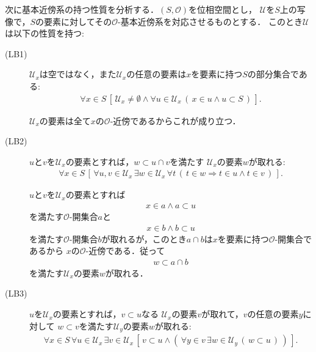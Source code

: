 	次に基本近傍系の持つ性質を分析する．$(S,\mathscr{O})$を位相空間とし，
	$\mathcal{U}$を$S$上の写像で，$S$の要素に対してその$\mathscr{O}$-基本近傍系を対応させるものとする．
	このとき$\mathcal{U}$は以下の性質を持つ:
	\begin{description}
		\item[(LB1)] $\mathcal{U}_{x}$は空ではなく，また$\mathcal{U}_{x}$の任意の要素は$x$を要素に持つ$S$の部分集合である:
			\begin{align}
				\forall x \in S\, \left[\, \mathcal{U}_{x} \neq \emptyset 
				\wedge \forall u \in \mathcal{U}_{x}\, (\, x \in u \wedge u \subset S\, )\, \right].
			\end{align}
			
			\begin{sketch}
				$\mathscr{U}_{x}$の要素は全て$x$の$\mathscr{O}$-近傍であるからこれが成り立つ．
				\QED
			\end{sketch}
			
		\item[(LB2)] $u$と$v$を$\mathcal{U}_{x}$の要素とすれば，$w \subset u \cap v$を満たす
			$\mathcal{U}_{x}$の要素$w$が取れる:
			\begin{align}
				\forall x \in S\, 
				\left[\, \forall u,v \in \mathcal{U}_{x}\, \exists w \in \mathcal{U}_{x}\,
				\forall t\, \left(\, t \in w \Longrightarrow t \in u \wedge t \in v\, \right)\, \right].
			\end{align}
			
			\begin{sketch}
				$u$と$v$を$\mathcal{U}_{x}$の要素とすれば
				\begin{align}
					x \in a \wedge a \subset u
				\end{align}
				を満たす$\mathscr{O}$-開集合$a$と
				\begin{align}
					x \in b \wedge b \subset u
				\end{align}
				を満たす$\mathscr{O}$-開集合$b$が取れるが，このとき$a \cap b$は$x$を要素に持つ$\mathscr{O}$-開集合であるから
				$x$の$\mathscr{O}$-近傍である．従って
				\begin{align}
					w \subset a \cap b
				\end{align}
				を満たす$\mathcal{U}_{x}$の要素$w$が取れる．
				\QED
			\end{sketch}
			
		\item[(LB3)] $u$を$\mathcal{U}_{x}$の要素とすれば，$v \subset u$なる
			$\mathcal{U}_{x}$の要素$v$が取れて，$v$の任意の要素$y$に対して
			$w \subset v$を満たす$\mathcal{U}_{y}$の要素$w$が取れる:
			\begin{align}
				\forall x \in S\, \forall u \in \mathcal{U}_{x}\, \exists v \in \mathcal{U}_{x}\,
				\left[\, v \subset u \wedge \left(\, \forall y \in v\,
				\exists w \in \mathcal{U}_{y}\, (\, w \subset u\, )\, \right)\, \right].
			\end{align}
			

\end{description}
